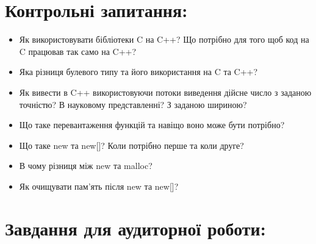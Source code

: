 \documentclass[a5paper,titlepage,openany,twoside,draft]{book_unv}%
\begin{document}
\section{Контрольні запитання:}
\begin{itemize}

\item
  Як використовувати бібліотеки C на C++? Що потрібно для того щоб код
  на C працював так само на C++?
\item
  Яка різниця булевого типу та його використання на C та C++?
\item
  Як вивести в C++ використовуючи потоки виведення дійсне число з
  заданою точністю? В науковому представленні? З заданою шириною?
\item
  Що таке перевантаження функцій та навіщо воно може бути потрібно?
\item
  Що таке new та new{[}{]}? Коли потрібно перше та коли друге?
\item
  В чому різниця між new та malloc?
\item
  Як очищувати пам'ять після new та new{[}{]}?
\end{itemize}

\section{Завдання для аудиторної роботи:}
\end{document}
